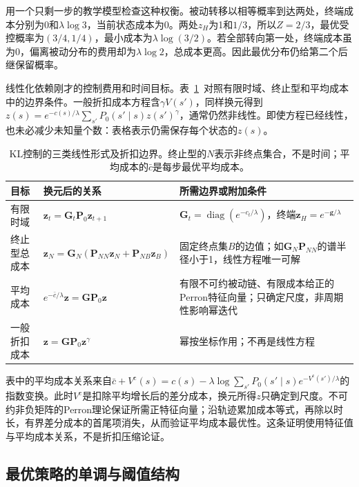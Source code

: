 用一个只剩一步的教学模型检查这种权衡。被动转移以相等概率到达两处，终端成本分别为0和$\lambda\log3$，当前状态成本为0。两处$z_H$为1和$1/3$，所以$Z=2/3$，最优受控概率为$(3/4,1/4)$，最小成本为$\lambda\log(3/2)$。若全部转向第一处，终端成本虽为0，偏离被动分布的费用却为$\lambda\log2$，总成本更高。因此最优分布仍给第二个后继保留概率。

线性化依赖刚才的控制费用和时间目标。表~\ref{tab:rl-planning-kl-regimes}~对照有限时域、终止型和平均成本中的边界条件。一般折扣成本方程含$\gamma V(s')$，同样换元得到$z(s)=e^{-c(s)/\lambda}\sum_{s'}P_0(s'\mid s)z(s')^\gamma$，通常仍然非线性。即使方程已经线性，也未必减少未知量个数：表格表示仍需保存每个状态的$z(s)$。

\begin{table}[htbp]
 \centering
 \small
 \begin{tabularx}{\linewidth}{@{}l>{\raggedright\arraybackslash}X>{\raggedright\arraybackslash}X@{}}
  \toprule
  目标 & 换元后的关系 & 所需边界或附加条件\\
  \midrule
  有限时域 & $\bm z_t=\bm G_t\bm P_0\bm z_{t+1}$ & $\bm G_t=\operatorname{diag}(e^{-c_t/\lambda})$，终端$\bm z_H=e^{-\bm g/\lambda}$\\
  终止型总成本 & $\bm z_N=\bm G_N(\bm P_{NN}\bm z_N+\bm P_{NB}\bm z_B)$ & 固定终点集$B$的边值；如$\bm G_N\bm P_{NN}$的谱半径小于1，线性方程唯一可解\\
  平均成本 & $e^{-\bar c/\lambda}\bm z=\bm G\bm P_0\bm z$ & 有限不可约被动链、有限成本给正的Perron特征向量；只确定尺度，非周期性影响幂迭代\\
  一般折扣成本 & $\bm z=\bm G\bm P_0\bm z^\gamma$ & 幂按坐标作用；不再是线性方程\\
  \bottomrule
 \end{tabularx}
 \caption{KL控制的三类线性形式及折扣边界。终止型的$N$表示非终点集合，不是时间；平均成本的$\bar c$是每步最优平均成本。}
 \label{tab:rl-planning-kl-regimes}
\end{table}

表中的平均成本关系来自$\bar c+V^{\mathrm c}(s)=c(s)-\lambda\log\sum_{s'}P_0(s'\mid s)e^{-V^{\mathrm c}(s')/\lambda}$的指数变换。此时$V^{\mathrm c}$是扣除平均增长后的差分成本，换元所得$z$只确定到尺度。不可约非负矩阵的Perron理论保证所需正特征向量；沿轨迹累加成本等式，再除以时长，有界差分成本的首尾项消失，从而验证平均成本最优性。这条证明使用特征值与平均成本关系，不是折扣压缩论证。

\subsection{最优策略的单调与阈值结构}
\label{sec:rl-planning-monotone}

